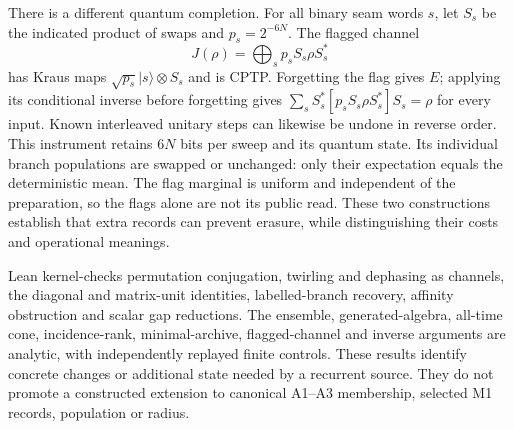 There is a different quantum completion. For all binary seam words $s$,
let $S_s$ be the indicated product of swaps and $p_s=2^{-6N}$. The
flagged channel
\[
 J(\rho)=\bigoplus_s p_s S_s\rho S_s^*
\]
has Kraus maps $\sqrt{p_s}|s\rangle\otimes S_s$ and is CPTP. Forgetting
the flag gives $E$; applying its conditional inverse before forgetting
gives $\sum_s S_s^*[p_sS_s\rho S_s^*]S_s=\rho$ for every input.
Known interleaved unitary steps can likewise be undone in reverse order.
This instrument retains $6N$ bits per sweep and its quantum state.
Its individual branch populations are swapped or unchanged: only their
expectation equals the deterministic mean. The flag marginal is uniform
and independent of the preparation, so the flags alone are not its public
read. These two constructions establish that extra records can prevent
erasure, while distinguishing their costs and operational meanings.

Lean kernel-checks permutation conjugation, twirling and dephasing as
channels, the diagonal and matrix-unit identities, labelled-branch
recovery, affinity obstruction and scalar gap reductions. The ensemble,
generated-algebra, all-time cone, incidence-rank, minimal-archive,
flagged-channel and inverse arguments are analytic, with independently
replayed finite controls. These results
identify concrete changes or additional state needed by a recurrent source.
They do not promote a constructed extension to canonical A1--A3 membership,
selected M1 records, population or radius.

